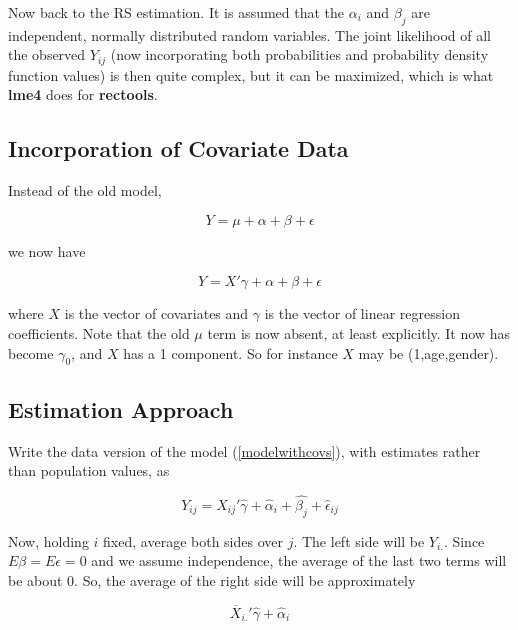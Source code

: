 Now back to the RS estimation.  It is assumed that the $\alpha_i$ and
$\beta_j$ are independent, normally distributed random variables.  The
joint likelihood of all the observed $Y_{ij}$ (now incorporating both
probabilities and probability density function values) is then quite
complex, but it can be maximized, which is what \textbf{lme4} does for
\textbf{rectools}.  

\subsection{Incorporation of Covariate Data}

Instead of the old model, 

\begin{equation}
Y = \mu + \alpha + \beta + \epsilon
\end{equation}

we now have

\begin{equation}
\label{modelwithcovs}
Y = X' \gamma + \alpha + \beta + \epsilon
\end{equation}

where $X$ is the vector of covariates and $\gamma$ is the vector of
linear regression coefficients.  Note that the old $\mu$ term is now
absent, at least explicitly.  It now has become $\gamma_0$, and $X$ has
a 1 component.  So for instance $X$ may be (1,age,gender).

\subsection{Estimation Approach}

Write the data version of the model (\ref{modelwithcovs}), with
estimates rather than population values, as 

\begin{equation}
Y_{ij} = X_{ij}' \widehat{\gamma} +
\widehat{\alpha}_i + \widehat{\beta_j} + \widehat{\epsilon}_{ij}
\end{equation}

Now, holding $i$ fixed, average both sides over $j$.  The left side will
be $Y_{i.}$.  Since $E\beta = E\epsilon = 0$ and we assume independence,
the average of the last two terms will be about 0.  So, the average of
the right side will be approximately

\begin{equation}
\overline{X}_{i.}' \widehat{\gamma} +
\widehat{\alpha}_{i} 
\end{equation}

